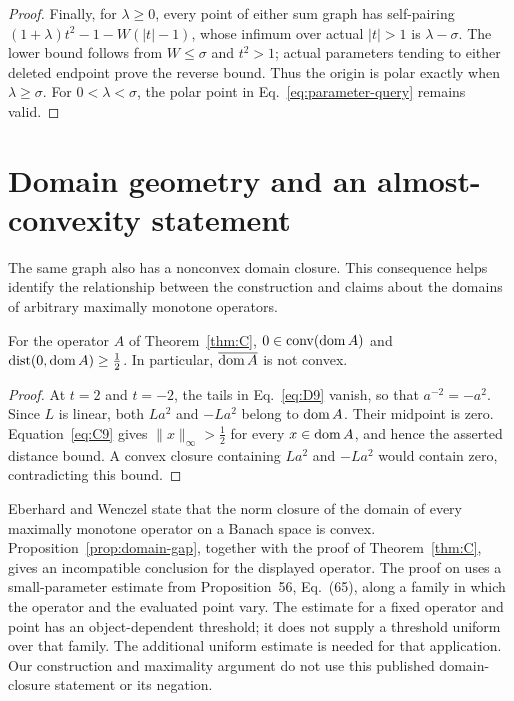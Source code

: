 \begin{proof}
Finally, for $\lambda\ge0$, every point of either sum graph has
self-pairing
$(1+\lambda)t^2-1-W(|t|-1)$, whose infimum over actual $|t|>1$ is
$\lambda-\sigma$. The lower bound follows from $W\le\sigma$ and
$t^2>1$; actual parameters tending to either deleted endpoint prove
the reverse bound. Thus the origin is polar exactly when
$\lambda\ge\sigma$. For $0<\lambda<\sigma$, the polar point in
Eq.~\eqref{eq:parameter-query} remains valid.
\end{proof}


\section{Domain geometry and an almost-convexity statement}
\label{sec:domain-comparison}
The same graph also has a nonconvex domain closure. This consequence
helps identify the relationship between the construction and claims
about the domains of arbitrary maximally monotone operators.

\begin{proposition}\label{prop:domain-gap}
For the operator $A$ of Theorem~\ref{thm:C},
$0\in\operatorname{conv}(\operatorname{dom} A)$ and
$\operatorname{dist}(0,\operatorname{dom} A)\ge\frac{1}{2}$.
In particular, $\overline{\operatorname{dom} A}$ is not convex.
\end{proposition}
\begin{proof}
At $t=2$ and $t=-2$, the tails in Eq.~\eqref{eq:D9} vanish, so that
$a^{-2}=-a^2$. Since $L$ is linear, both $La^2$ and $-La^2$ belong
to $\operatorname{dom} A$. Their midpoint is zero. Equation~\eqref{eq:C9} gives
$\|x\|_\infty>\frac{1}{2}$ for every $x\in\operatorname{dom} A$, and hence the asserted
distance bound. A convex closure containing $La^2$ and $-La^2$ would
contain zero, contradicting this bound.
\end{proof}

Eberhard and Wenczel \cite[Theorem~57]{eberhardwenczel2024} state that
the norm closure of the domain of every maximally monotone operator on
a Banach space is convex. Proposition~\ref{prop:domain-gap}, together
with the proof of Theorem~\ref{thm:C}, gives an incompatible
conclusion for the displayed operator. The proof on
\cite[pp.~39--40]{eberhardwenczel2024} uses a small-parameter estimate
from Proposition~56, Eq.~(65), along a family in which the operator and
the evaluated point vary. The estimate for a fixed operator and point
has an object-dependent threshold; it does not supply a threshold
uniform over that family. The additional uniform estimate is needed
for that application. Our construction and maximality argument do not
use this published domain-closure statement or its negation.

